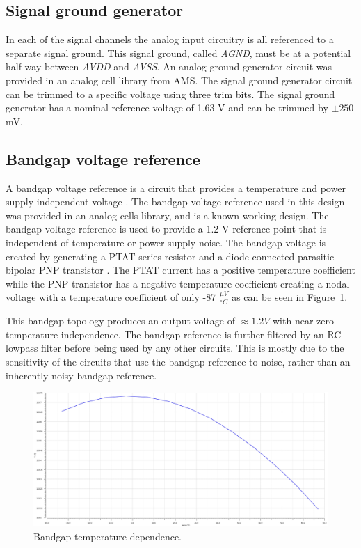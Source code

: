 \documentclass[12pt,oneside,final]{siuethesis}
\theoremstyle{definition}
\begin{document}
\subsection{Signal ground generator}
\par In each of the signal channels the analog input circuitry is all referenced to a separate signal ground. This signal ground, called \emph{AGND}, must be at a potential half way between \emph{AVDD} and \emph{AVSS}. An analog ground generator circuit was provided in an analog cell library from AMS. The signal ground generator circuit can be trimmed to a specific voltage using three trim bits. The signal ground generator has a nominal reference voltage of 1.63 V and can be trimmed by $\pm 250$ mV.

\subsection{Bandgap voltage reference}
\par A bandgap voltage reference is a circuit that provides a temperature and power supply independent voltage \cite{ALLEN}. The bandgap voltage reference used in this design was provided in an analog cells library, and is a known working design. The bandgap voltage reference is used to provide a 1.2 V reference point that is independent of temperature or power supply noise. The bandgap voltage is created by generating a PTAT series resistor and a diode-connected parasitic bipolar PNP transistor \cite{ALLEN}. The PTAT current has a positive temperature coefficient while the PNP transistor has a negative temperature coefficient creating a nodal voltage with a temperature coefficient of only -87 $\frac{\mu V}{^{\circ}C}$ as can be seen in Figure~\ref{fig:bandgap}.
\par This bandgap topology produces an output voltage of $\approx 1.2 V$ with near zero temperature independence. The bandgap reference is further filtered by an RC lowpass filter before being used by any other circuits. This is mostly due to the sensitivity of the circuits that use the bandgap reference to noise, rather than an inherently noisy bandgap reference.

\begin{figure}[htbp!]
\centering
\includegraphics[scale=.3,keepaspectratio=true]{../data/bandgap_temp.png} 
\caption{Bandgap temperature dependence.}
\label{fig:bandgap}
\end{figure}
\end{document}
